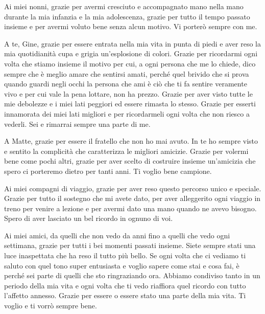 \documentclass[a4paper,12pt]{report}
\begin{document}
\bigskip
Ai miei nonni, grazie per avermi cresciuto e accompagnato mano nella mano durante la mia infanzia e la mia adolescenza, grazie per tutto il tempo passato insieme e per avermi voluto bene senza alcun motivo. Vi porterò sempre con me.

\bigskip
A te, Gine, grazie per essere entrata nella mia vita in punta di piedi e aver reso la mia quotidianità cupa e grigia un'esplosione di colori. Grazie per ricordarmi ogni volta che stiamo insieme il motivo per cui, a ogni persona che me lo chiede, dico sempre che è meglio amare che sentirsi amati, perché quel brivido che si prova quando guardi negli occhi la persona che ami è ciò che ti fa sentire veramente vivo e per cui vale la pena lottare, non ha prezzo. Grazie per aver visto tutte le mie debolezze e i miei lati peggiori ed essere rimasta lo stesso. Grazie per esserti innamorata dei miei lati migliori e per ricordarmeli ogni volta che non riesco a vederli. Sei e rimarrai sempre una parte di me.

\bigskip
A Matte, grazie per essere il fratello che non ho mai avuto. In te ho sempre visto e sentito la complicità che caratterizza le migliori amicizie. Grazie per volermi bene come pochi altri, grazie per aver scelto di costruire insieme un'amicizia che spero ci porteremo dietro per tanti anni. Ti voglio bene campione.

\bigskip
Ai miei compagni di viaggio, grazie per aver reso questo percorso unico e speciale. Grazie per tutto il sostegno che mi avete dato, per aver alleggerito ogni viaggio in treno per venire a lezione e per avermi dato una mano quando ne avevo bisogno. Spero di aver lasciato un bel ricordo in ognuno di voi.

\bigskip
Ai miei amici, da quelli che non vedo da anni fino a quelli che vedo ogni settimana, grazie per tutti i bei momenti passati insieme. Siete sempre stati una luce inaspettata che ha reso il tutto più bello. Se ogni volta che ci vediamo ti saluto con quel tono super entusiasta e voglio sapere come stai e cosa fai, è perché sei parte di quelli che sto ringraziando ora. Abbiamo condiviso tanto in un periodo della mia vita e ogni volta che ti vedo riaffiora quel ricordo con tutto l'affetto annesso. Grazie per essere o essere stato una parte della mia vita. Ti voglio e ti vorrò sempre bene.

\end{document}
